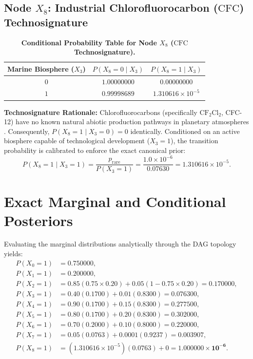 \subsection{Node $X_8$: Industrial Chlorofluorocarbon ($\mathrm{CFC}$) Technosignature}
\begin{table}[htbp]
\centering
\caption{\textbf{Conditional Probability Table for Node $X_8$ ($\mathrm{CFC}$ Technosignature).}}
\label{tab:cpt_x8}
\small
\begin{tabular}{ccc}
\toprule
\textbf{Marine Biosphere ($X_3$)} & $P(X_8 = 0 \mid X_3)$ & $P(X_8 = 1 \mid X_3)$ \\
\midrule
$0$ & $1.00000000$ & $0.00000000$ \\
$1$ & $0.99998689$ & $1.310616 \times 10^{-5}$ \\
\bottomrule
\end{tabular}
\end{table}
\textbf{Technosignature Rationale:} Chlorofluorocarbons (specifically $\mathrm{CF}_2\mathrm{Cl}_2$, CFC-12) have no known natural abiotic production pathways in planetary atmospheres \cite{lin2014, haqqmisra2022}. Consequently, $P(X_8 = 1 \mid X_3 = 0) = 0$ identically. Conditioned on an active biosphere capable of technological development ($X_3=1$), the transition probability is calibrated to enforce the exact canonical prior:
\begin{equation}
P(X_8 = 1 \mid X_3 = 1) = \frac{p_{\mathrm{rare}}}{P(X_3 = 1)} = \frac{1.0 \times 10^{-6}}{0.07630} = 1.310616 \times 10^{-5}.
\end{equation}

\section{Exact Marginal and Conditional Posteriors}\label{sec:app_exact_posteriors}

Evaluating the marginal distributions analytically through the DAG topology yields:
\begin{align}
P(X_0 = 1) &= 0.750000, \\
P(X_1 = 1) &= 0.200000, \\
P(X_2 = 1) &= 0.85(0.75 \times 0.20) + 0.05(1 - 0.75 \times 0.20) = 0.170000, \\
P(X_3 = 1) &= 0.40(0.1700) + 0.01(0.8300) = \mathbf{0.076300}, \\
P(X_4 = 1) &= 0.90(0.1700) + 0.15(0.8300) = 0.277500, \\
P(X_5 = 1) &= 0.80(0.1700) + 0.20(0.8300) = 0.302000, \\
P(X_6 = 1) &= 0.70(0.2000) + 0.10(0.8000) = 0.220000, \\
P(X_7 = 1) &= 0.05(0.0763) + 0.0001(0.9237) = 0.003907, \\
P(X_8 = 1) &= (1.310616 \times 10^{-5})(0.0763) + 0 = \mathbf{1.000000 \times 10^{-6}}.
\end{align}

